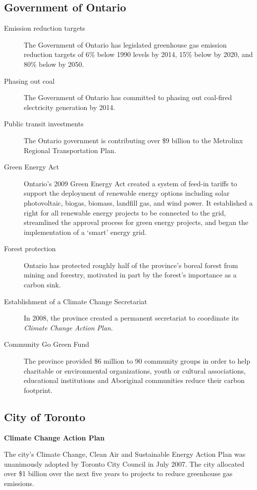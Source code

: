 		
		
		\subsection{Government of Ontario}
\begin{description}
	\item[Emission reduction targets] The Government of Ontario has legislated greenhouse gas emission reduction targets of 6\% below 1990 levels by 2014, 15\% below by 2020, and 80\% below by 2050.
	\item[Phasing out coal] The Government of Ontario has committed to phasing out coal-fired electricity generation by 2014.
	\item[Public transit investments] The Ontario government is contributing over \$9 billion to the Metrolinx Regional Transportation Plan.
	\item[Green Energy Act] Ontario's 2009 Green Energy Act created a system of feed-in tariffs to support the deployment of renewable energy options including solar photovoltaic, biogas, biomass, landfill gas, and wind power. 
It established a right for all renewable energy projects to be connected to the grid, streamlined the approval process for green energy projects, and began the implementation of a `smart' energy grid.
	\item[Forest protection] Ontario has protected roughly half of the province's boreal forest from mining and forestry, motivated in part by the forest's importance as a carbon sink.
	\item[Establishment of a Climate Change Secretariat] In 2008, the province created a permanent secretariat to coordinate its \emph{Climate Change Action Plan}.
	\item[Community Go Green Fund] The province provided \$6 million to 90 community groups in order to help charitable or environmental organizations, youth or cultural associations, educational institutions and Aboriginal communities reduce their carbon footprint. 
\end{description}	



	\subsection{City of Toronto}



\textbf{Climate Change Action Plan}

The city's Climate Change, Clean Air and Sustainable Energy Action Plan was unanimously adopted by Toronto City Council in July 2007. The city allocated over \$1 billion over the next five years to projects to reduce greenhouse gas emissions.\cite{TorontoEnvOff2008}

